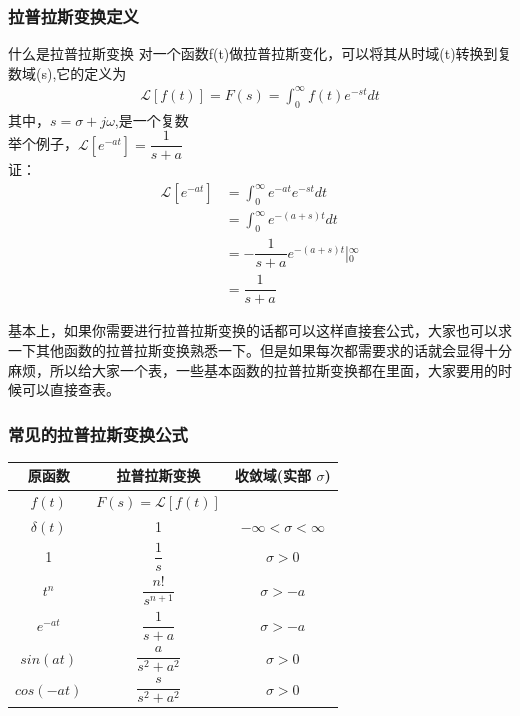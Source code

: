 \documentclass[UTF8,a4paper,12pt]{ctexart}
\begin{document}
  \subsubsection{拉普拉斯变换定义}
  \begin{titlebox}{什么是拉普拉斯变换}
    对一个函数f(t)做拉普拉斯变化，可以将其从时域(t)转换到复数域(s),它的定义为
    \begin{align*}
      \mathcal{L}\left[ f\left( t \right) \right] =F\left( s \right) =\int_0^{\infty}{f\left( t \right)}e^{-st}dt
    \end{align*}
    其中，$s=\sigma +j\omega $,是一个复数
    \\举个例子，$\mathcal{L}[e^{-at}]=\dfrac{1}{s+a}$
   \\ 证：
   \begin{align*}
    \mathcal{L}[e^{-at}] &= \int_0^{\infty}{e^{-at}e^{-st} dt}\\
         &= \int_0^{\infty}{e^{-\left( a+s \right) t}dt}\\
         &= -\dfrac{1}{s+a}e^{-\left( a+s \right) t}\left| _{0}^{\infty} \right. \\
         &=\dfrac{1}{s+a}
  \end{align*}
  
  \end{titlebox}
  基本上，如果你需要进行拉普拉斯变换的话都可以这样直接套公式，大家也可以求一下其他函数的拉普拉斯变换熟悉一下。但是如果每次都需要求的话就会显得十分麻烦，所以给大家一个表，一些基本函数的拉普拉斯变换都在里面，大家要用的时候可以直接查表。
  \subsubsection{常见的拉普拉斯变换公式}
  \begin{titlebox}{1}
    \begin{flushleft}
    \begin{tabular}{c|c|c}
      \toprule
      \hspace{1cm}原函数\hspace{1cm} & \hspace{1cm}拉普拉斯变换\hspace{1cm} & 收敛域(实部 $\sigma$)\\
      \midrule
      $f(t)$ & $F(s) =\mathcal{L}[f(t)]$ &  \\
      \midrule
      $\delta(t)$   &   1   &  $-\infty <\sigma<\infty$\\
      \midrule
      1   &   $\dfrac{1}{s}$   &  $\sigma>0$  \\
      \midrule
      $t^n$   &   $\dfrac{n!}{s^{n+1}}$   &  $\sigma>-a$  \\
      \midrule
      $e^{-at}$   &   $\dfrac{1}{s+a}$   &  $\sigma>-a$  \\
      \midrule
      $sin(at)$   &   $\dfrac{a}{s^2+a^2}$   &  $\sigma>0$  \\
      \midrule
      $cos(-at)$   &   $\dfrac{s}{s^2+a^2}$   &  $\sigma>0$  \\
      \bottomrule
    \end{tabular}
   
  \end{flushleft}
  \end{titlebox}
\end{document}
